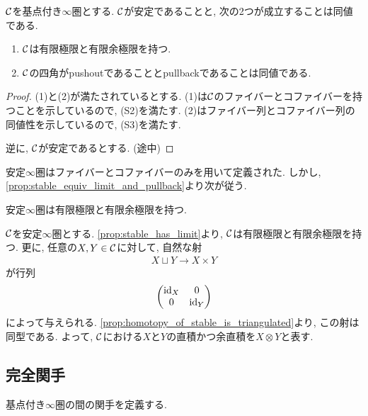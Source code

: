 \documentclass[uplatex, a4paper, 14Q, dvipdfmx]{jsarticle}
\begin{document}
\begin{proposition} \label{prop:stable_equiv_limit_and_pullback}
  $\mathcal{C}$を基点付き$\infty$圏とする. 
  $\mathcal{C}$が安定であることと, 次の2つが成立することは同値である. 
  \begin{enumerate}
    \item $\mathcal{C}$は有限極限と有限余極限を持つ. 
    \item $\mathcal{C}$の四角がpushoutであることとpullbackであることは同値である.
  \end{enumerate}
\end{proposition}

\begin{proof}
  (1)と(2)が満たされているとする. 
  (1)は$\mathcal{C}$のファイバーとコファイバーを持つことを示しているので, (S2)を満たす.
  (2)はファイバー列とコファイバー列の同値性を示しているので, (S3)を満たす. 

  逆に, $\mathcal{C}$が安定であるとする. (途中)
\end{proof}

安定$\infty$圏はファイバーとコファイバーのみを用いて定義された. 
しかし, \cref{prop:stable_equiv_limit_and_pullback}より次が従う. 

\begin{corollary} \label{prop:stable_has_limit}
  安定$\infty$圏は有限極限と有限余極限を持つ. 
\end{corollary}

\begin{remark}
  $\mathcal{C}$を安定$\infty$圏とする. 
  \cref{prop:stable_has_limit}より, $\mathcal{C}$は有限極限と有限余極限を持つ. 
  更に, 任意の$X, Y \in \mathcal{C}$に対して, 自然な射
  \begin{align*}
    X \sqcup Y \to X \times Y
  \end{align*}
  が行列
  \begin{align*}
    \begin{pmatrix}
      \mathrm{id}_X & 0 \\
      0 & \mathrm{id}_Y
    \end{pmatrix}
  \end{align*}
  によって与えられる. 
  \cref{prop:homotopy_of_stable_is_triangulated}より, この射は同型である.
  よって, $\mathcal{C}$における$X$と$Y$の直積かつ余直積を$X \otimes Y$と表す. 
\end{remark}

\subsection{完全関手}

基点付き$\infty$圏の間の関手を定義する. 
\end{document}

